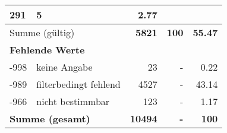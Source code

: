 \begin{longtable}{lXrrr}
       \num{291} &
       \num[round-mode=places,round-precision=2]{5} &
         \num[round-mode=places,round-precision=2]{2,77} \\
     \midrule
     \multicolumn{2}{l}{Summe (gültig)} &
       \textbf{\num{5821}} &
     \textbf{100} &
       \textbf{\num[round-mode=places,round-precision=2]{55,47}} \\
     \multicolumn{5}{l}{\textbf{Fehlende Werte}}\\
       -998 &
       keine Angabe &
         \num{23} &
        - &
         \num[round-mode=places,round-precision=2]{0,22} \\
       -989 &
       filterbedingt fehlend &
         \num{4527} &
        - &
         \num[round-mode=places,round-precision=2]{43,14} \\
       -966 &
       nicht bestimmbar &
         \num{123} &
        - &
         \num[round-mode=places,round-precision=2]{1,17} \\
     \midrule
     \multicolumn{2}{l}{\textbf{Summe (gesamt)}} &
          \textbf{\num{10494}} &
        \textbf{-} &
        \textbf{100} \\
     \bottomrule
     \end{longtable}
     
